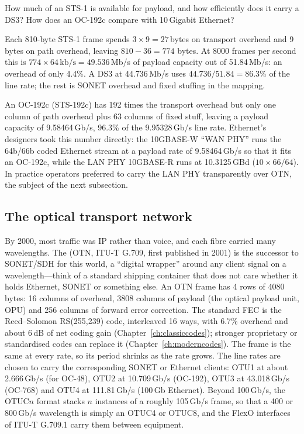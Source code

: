 \begin{worked}
How much of an STS-1 is available for payload, and how efficiently does it carry a DS3? How does
an OC-192c compare with 10\,Gigabit Ethernet?

Each 810-byte STS-1 frame spends $3\times9=27$\,bytes on transport overhead and 9 bytes on path
overhead, leaving $810-36=774$ bytes. At 8000 frames per second this is
$774\times64\,\text{kb/s}=49.536$\,Mb/s of payload capacity out of 51.84\,Mb/s: an overhead of only
4.4\%. A DS3 at 44.736\,Mb/s uses $44.736/51.84=86.3$\% of the line rate; the rest is SONET overhead
and fixed stuffing in the mapping.

An OC-192c (STS-192c) has 192 times the transport overhead but only one column of path overhead plus
63 columns of fixed stuff, leaving a payload capacity of 9.58464\,Gb/s, 96.3\% of the 9.95328\,Gb/s
line rate. Ethernet's designers took this number directly: the 10GBASE-W ``WAN PHY'' runs the 64b/66b
coded Ethernet stream at a payload rate of 9.58464\,Gb/s so that it fits an OC-192c, while the LAN
PHY 10GBASE-R runs at 10.3125\,GBd ($10\times66/64$). In practice operators preferred to carry
the LAN PHY transparently over OTN, the subject of the next subsection.
\end{worked}



\subsection{The optical transport network}

By 2000, most traffic was IP rather than voice, and each fibre carried many wavelengths. The
 (OTN, ITU-T G.709, first published in 2001) is the successor to
SONET/SDH for this world, a ``digital wrapper'' around any client signal on a wavelength---think of
a standard shipping container that does not care whether it holds Ethernet, SONET or something
else. An OTN frame has 4 rows of 4080 bytes: 16 columns of overhead, 3808 columns of payload (the
optical payload unit, OPU) and 256 columns of forward error correction. The standard FEC is the
Reed--Solomon RS(255,239) code, interleaved 16 ways, with 6.7\% overhead and about 6\,dB of net
coding gain (Chapter~\ref{ch:classiccodes}); stronger proprietary or standardised codes can replace
it (Chapter~\ref{ch:moderncodes}). The frame is the same at every rate, so its period shrinks as the
rate grows. The line rates are chosen to carry the corresponding SONET or Ethernet clients:
OTU1 at about 2.666\,Gb/s (for OC-48), OTU2 at 10.709\,Gb/s (OC-192), OTU3 at 43.018\,Gb/s
(OC-768) and OTU4 at 111.81\,Gb/s (100\,Gb Ethernet). Beyond 100\,Gb/s, the OTUC$n$ format
stacks $n$ instances of a roughly 105\,Gb/s frame, so that a 400 or 800\,Gb/s wavelength is simply
an OTUC4 or OTUC8, and the FlexO interfaces of ITU-T G.709.1 carry them between equipment.

